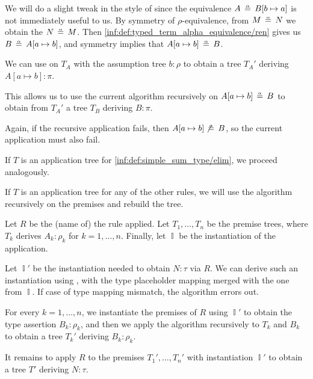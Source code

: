 \begin{algorithm}
\begin{thmenum}
\begin{thmenum}
      We will do a slight tweak in the style of  since the equivalence \( A \aequiv B[b \mapsto a] \) is not immediately useful to us. By symmetry of \( \rho \)-equivalence, from \( M \aequiv N \) we obtain the \( N \aequiv M \). Then \ref{inf:def:typed_term_alpha_equivalence/ren} gives us \( B \aequiv A[a \mapsto b] \), and symmetry implies that \( A[a \mapsto b] \aequiv B \).

      We can use  on \( T_A \) with the assumption tree \( b: \rho \) to obtain a tree \( T_A' \) deriving \( A[a \mapsto b]: \pi \).

      This allows us to use the current algorithm recursively on \( A[a \mapsto b] \aequiv B \) to obtain from \( T_A' \) a tree \( T_B \) deriving \( B: \pi \).

      Again, if the recursive application fails, then \( A[a \mapsto b] \not\aequiv B \), so the current application must also fail.
    \end{thmenum}

     If \( T \) is an application tree for \ref{inf:def:simple_sum_type/elim}, we proceed analogously.

     If \( T \) is an application tree for any of the other rules, we will use the algorithm recursively on the premises and rebuild the tree.

    Let \( R \) be the (name of) the rule applied. Let \( T_1, \ldots, T_n \) be the premise trees, where \( T_k \) derives \( A_k: \rho_k \) for \( k = 1, \ldots, n \). Finally, let \( \BbbI \) be the instantiation of the application.

    Let \( \BbbI' \) be the instantiation needed to obtain \( N: \tau \) via \( R \). We can derive such an instantiation using , with the type placeholder mapping merged with the one from \( \BbbI \). If case of type mapping mismatch, the algorithm errors out.

    For every \( k = 1, \ldots, n \), we instantiate the premises of \( R \) using \( \BbbI' \) to obtain the type assertion \( B_k: \rho_k \), and then we apply the algorithm recursively to \( T_k \) and \( B_k \) to obtain a tree \( T_k' \) deriving \( B_k: \rho_k \).

    It remains to apply \( R \) to the premises \( T_1', \ldots, T_n' \) with instantiation \( \BbbI' \) to obtain a tree \( T' \) deriving \( N: \tau \).
  \end{thmenum}
\end{algorithm}
